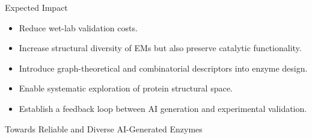 \documentclass[aspectratio=169]{beamer}
\begin{document}
	\begin{frame}{Expected Impact}
		
		\begin{itemize}
			\item Reduce wet-lab validation costs.
			
			\item Increase structural diversity of EMs but also preserve catalytic functionality.
			
			\item Introduce graph-theoretical and combinatorial descriptors into enzyme design.
			
			\item Enable systematic exploration of protein structural space.
			
			\item Establish a feedback loop between AI generation and experimental validation.
		\end{itemize}
		
		\vspace{0.8cm}
		
		\begin{center}
			\Large
			Towards Reliable and Diverse AI-Generated Enzymes
		\end{center}
		
	\end{frame}
	
\end{document}
